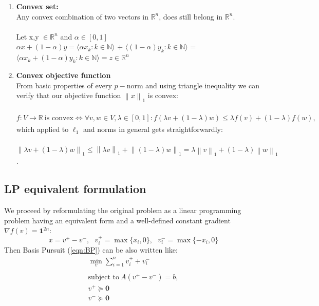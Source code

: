 \documentclass[journal,article,submit,electronics,pdftex]{Definitions/mdpi}
\newcommand{\norm}[1]{\left\lVert#1\right\rVert}
\begin{document}
{\begin{enumerate}
  \item \textbf{Convex set:}\\
  Any convex combination of two vectors in $\mathbb{R}^n$, does still belong in $\mathbb{R}^n$.\\\\
  Let x,y $\in \mathbb{R}^n$ and $\alpha \in [0,1]$\\
  $\alpha x + (1- \alpha)y = \langle \alpha x_k : k \in \mathbb{N} \rangle$ +
  $\langle (1-\alpha) y_k : k \in \mathbb{N} \rangle$ = $\langle \alpha x_k + (1-\alpha) y_k : k \in \mathbb{N} \rangle = z \in \mathbb{R}^n$ \\
  \item \textbf{Convex objective function}\\
  From basic properties of every $p-$norm and using triangle inequality we can verify that our objective function $\norm{x}_1$ is convex:\\\\
$f: V\xrightarrow[]{} \mathbb{R} \: \text{is convex} \Leftrightarrow \forall v,w \in V, \lambda \in [0,1] : f(\lambda v + (1-\lambda)w) \leq \lambda f(v) + (1-\lambda)f(w),$ 
which applied to $\ell_1$ and norms in general gets straightforwardly: \\\\
$\norm{\lambda v + (1-\lambda)w}_1 \leq \norm{\lambda v}_1 + \norm{(1-\lambda)w}_1 = \lambda\norm{v}_1 + (1-\lambda)\norm{w}_1 $.
\\
\end{enumerate}
\subsection{LP equivalent formulation}

We proceed by reformulating the original problem as a linear programming problem having an equivalent form and a well-defined constant gradient $\nabla f(v) = \boldsymbol{1}^{2n}$: \\
\begin{equation}
x = v^+ - v^-,\:\:\:v_i^+ = \max{\{x_i, 0\}},\:\:\: v_i^- = \max{\{-x_i, 0\}}
\end{equation}
Then Basis Pursuit (\ref{eqn:BP}) can be also written like:\\
\begin{equation} \label{eq:reformulation}
\begin{array}{l}
\min\limits_{v}\sum_{i=1}^n{v^+_i + v^-_i}\\\\
\text{subject to}\: A(v^+ - v^-) = b,\\
v^+ \succeq \mathbf{0}\\
v^- \succeq \mathbf{0}
\end{array}
\end{equation}

}
\end{document}
